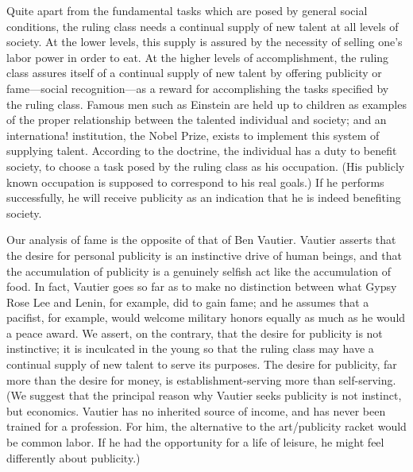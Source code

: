 \documentclass[10pt,twoside,draft]{memoir}
\begin{document}
{{{Quite apart from the fundamental tasks which are posed by general 
social conditions, the ruling class needs a continual supply of new talent at 
all levels of society. At the lower levels, this supply is assured by the 
necessity of selling one's labor power in order to eat. At the higher levels of 
accomplishment, the ruling class assures itself of a continual supply of new 
talent by offering publicity or fame---social recognition---as a reward for 
accomplishing the tasks specified by the ruling class. Famous men such as 
Einstein are held up to children as examples of the proper relationship 
between the talented individual and society; and an internationa! institution, 
the Nobel Prize, exists to implement this system of supplying talent. 
According to the doctrine, the individual has a duty to benefit society, to 
choose a task posed by the ruling class as his occupation. (His publicly 
known occupation is supposed to correspond to his real goals.) If he 
performs successfully, he will receive publicity as an indication that he is 
indeed benefiting society. 

Our analysis of fame is the opposite of that of Ben Vautier. Vautier 
asserts that the desire for personal publicity is an instinctive drive of human 
beings, and that the accumulation of publicity is a genuinely selfish act like 
the accumulation of food. In fact, Vautier goes so far as to make no 
distinction between what Gypsy Rose Lee and Lenin, for example, did to 
gain fame; and he assumes that a pacifist, for example, would welcome 
military honors equally as much as he would a peace award. We assert, on 
the contrary, that the desire for publicity is not instinctive; it is inculcated in 
the young so that the ruling class may have a continual supply of new talent 
to serve its purposes. The desire for publicity, far more than the desire for 
money, is establishment-serving more than self-serving. (We suggest that the 
principal reason why Vautier seeks publicity is not instinct, but economics. 
Vautier has no inherited source of income, and has never been trained for a 
profession. For him, the alternative to the art\slash publicity racket would be 
common labor. If he had the opportunity for a life of leisure, he might feel 
differently about publicity.) 

}}}
\end{document}
